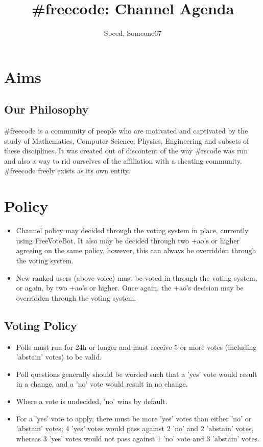 \documentclass[11pt,a4paper,notitlepage]{article}
\title{\#freecode: Channel Agenda}
\author{Speed, Someone67}
\begin{document}
\maketitle

\section{Aims}
\subsection{Our Philosophy}
\#freecode is a community of people who are motivated and captivated by the study of Mathematics, Computer Science, Physics, Engineering and subsets of these disciplines.
It was created out of discontent of the way \#rscode was run and also a way to rid ourselves of the affiliation with a cheating community.
\#freecode freely exists as its own entity.

\section{Policy}
\begin{itemize}
\item Channel policy may decided through the voting system in place, currently using FreeVoteBot.
It also may be decided through two +ao's or higher agreeing on the same policy, however, this can always be overridden through the voting system.
\item New ranked users (above voice) must be voted in through the voting system, or again, by two +ao's or higher.
Once again, the +ao's decision may be overridden through the voting system.
\end{itemize}

\subsection{Voting Policy}
\begin{itemize}
\item Polls must run for 24h or longer and must receive 5 or more votes (including 'abstain' votes) to be valid.
\item Poll questions generally should be worded such that a 'yes' vote would result in a change, and a 'no' vote would result in no change.
\item Where a vote is undecided, 'no' wins by default.
\item For a 'yes' vote to apply, there must be more 'yes' votes than either 'no' or 'abstain' votes; 4 'yes' votes would pass against 2 'no' and 2 'abstain' votes, whereas 3 'yes' votes would not pass against 1 'no' vote and 3 'abstain' votes.
\end{itemize}
\end{document}
